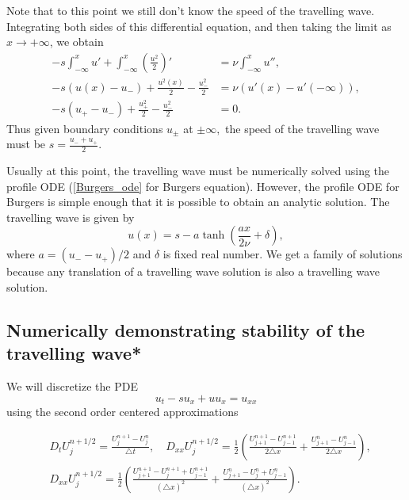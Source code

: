 Note that to this point we still don't know the speed of the travelling wave.  Integrating both sides of this differential equation, and then taking the limit as $x \to +\infty$, we obtain
\begin{align*}
-s\int_{-\infty}^x u' + \int_{-\infty}^x \left(\frac{u^2}{2}\right)' &= \nu \int_{-\infty}^x u'',\\	
-s(u(x) - u_-) + \frac{u^2(x)}{2} - \frac{u_-^2}{2} &= \nu (u'(x) - u'(-\infty)), \\
-s(u_+ - u_-) + \frac{u_+^2}{2} - \frac{u_-^2}{2} &= 0. 
\end{align*}
Thus given boundary conditions $u_{\pm}$ at $\pm \infty,$ the speed of the travelling wave must be $s = \frac{u_- + u_+}{2}.$ 

Usually at this point, the travelling wave must be numerically solved using the profile ODE (\eqref{Burgers_ode} for Burgers equation).  However, the profile ODE for Burgers is simple enough that it is possible to obtain an analytic solution. The travelling wave is  given by 
\[u(x) = s - a \tanh \left(\frac{ax }{2\nu} + \delta\right),\]
where $a = (u_- - u_+)/2$ and $\delta$ is fixed real number. We get a family of solutions because any translation of a travelling wave solution is also a travelling wave solution. 

\subsection{Numerically demonstrating stability of the travelling wave*}
We will discretize the PDE
\[u_t -su_x + uu_x = u_{xx}\]
using the second order centered approximations



\begin{align*}
&{ } D_t U_j^{n+1/2} = \frac{U_j^{n+1}-U_j^n}{\triangle t}, \quad 
D_{xx}U_j^{n+1/2} = \frac{1}{2} \left( \frac{U_{j+1}^{n+1}-U_{j-1}^{n+1}}{2 \triangle x} +  \frac{U_{j+1}^{n}-U_{j-1}^{n}}{2 \triangle x}\right) ,\\
&{ } D_{xx}U_j^{n+1/2} = \frac{1}{2} \left( \frac{U_{j+1}^{n+1}- U_{j}^{n+1}+U_{j-1}^{n+1}}{(\triangle x)^2} + \frac{U_{j+1}^{n}- U_{j}^{n}+U_{j-1}^{n}}{(\triangle x)^2}\right).
\end{align*}

